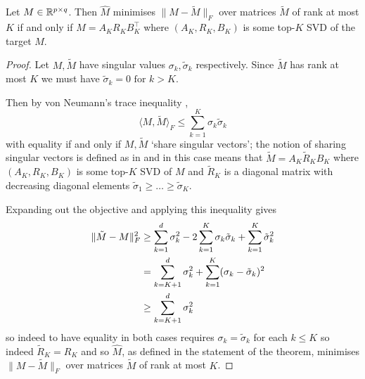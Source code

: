 \begin{theorem}\label{thm:eckhart-young}
Let $M \in \mathbb{R}^{p\times q}$. Then $\hat{M}$ minimises $\|M-\tilde{M}\|_F$ over matrices $\tilde{M}$ of rank at most $K$ if and only if $\hat{M} = A_K R_K B_K^\top$ where $(A_K,R_K,B_K)$ is some top-$K$ SVD of the target $M$.
\end{theorem}
\begin{proof}
    Let $M,\tilde{M}$ have singular values $\sigma_k,\tilde{\sigma}_k$ respectively.
    Since $\tilde{M}$ has rank at most $K$ we must have $\tilde \sigma_k = 0 \text{ for } k> K$.

    Then by von Neumann's trace inequality \citep{carlssonvon2021},
    \begin{equation*}
        \langle M, \tilde{M} \rangle_F \leq \sum_{k=1}^K \sigma_k \tilde{\sigma}_k
    \end{equation*}
    with equality if and only if $M,\tilde{M}$ `share singular vectors'; the notion of sharing singular vectors is defined as in \citet{carlssonvon2021} and in this case means that $\tilde{M} = A_K \tilde{R}_K B_K$ where $(A_K,R_K,B_K)$ is some top-$K$ SVD of $M$ and $\tilde{R}_K$ is a diagonal matrix with decreasing diagonal elements $\tilde{\sigma}_1\geq \dots \geq \tilde{\sigma}_K$.

    Expanding out the objective and applying this inequality gives
    \begin{align*}
        \lVert\tilde{M} - M\rVert_F^2
        &\geq \sum_{k=1}^d \sigma_k^2 - 2 \sum_{k=1}^K \sigma_k \tilde{\sigma}_k + \sum_{k=1}^K \tilde\sigma_k^2 \\
        &= \sum_{k=K+1}^d \sigma_k^2 + \sum_{k=1}^K (\sigma_k - \tilde{\sigma}_k)^2 \\
        &\geq \sum_{k=K+1}^d \sigma_k^2
    \end{align*}
    so indeed to have equality in both cases requires $\sigma_k = \tilde{\sigma}_k$ for each $k\leq K$ so indeed $\tilde{R}_K = R_K$ and so $\hat{M}$, as defined in the statement of the theorem, minimises $\|M-\tilde M\|_F$ over matrices $\tilde M$ of rank at most $K$.
\end{proof}


